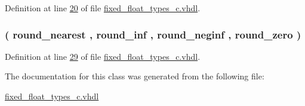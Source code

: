 Definition at line \hyperlink{fixed__float__types__c_8vhdl_source_l00020}{20} of file \hyperlink{fixed__float__types__c_8vhdl_source}{fixed\+\_\+float\+\_\+types\+\_\+c.\+vhdl}.

\hypertarget{classfixed__float__types_a3cab38cfb8c7d6b81f4f0b9953cd212f}{}
\subsubsection[{round\+\_\+type}]{ {\bfseries \textcolor{vhdlchar}{(}\textcolor{vhdlchar}{ }\textcolor{vhdlchar}{round\+\_\+nearest}\textcolor{vhdlchar}{ }\textcolor{vhdlchar}{,}\textcolor{vhdlchar}{ }\textcolor{vhdlchar}{round\+\_\+inf}\textcolor{vhdlchar}{ }\textcolor{vhdlchar}{,}\textcolor{vhdlchar}{ }\textcolor{vhdlchar}{round\+\_\+neginf}\textcolor{vhdlchar}{ }\textcolor{vhdlchar}{,}\textcolor{vhdlchar}{ }\textcolor{vhdlchar}{round\+\_\+zero}\textcolor{vhdlchar}{ }\textcolor{vhdlchar}{)}\textcolor{vhdlchar}{ }} \hspace{0.3cm}{\ttfamily [Type]}}\label{classfixed__float__types_a3cab38cfb8c7d6b81f4f0b9953cd212f}


Definition at line \hyperlink{fixed__float__types__c_8vhdl_source_l00029}{29} of file \hyperlink{fixed__float__types__c_8vhdl_source}{fixed\+\_\+float\+\_\+types\+\_\+c.\+vhdl}.



The documentation for this class was generated from the following file\+:\begin{DoxyCompactItemize}
\item 
\hyperlink{fixed__float__types__c_8vhdl}{fixed\+\_\+float\+\_\+types\+\_\+c.\+vhdl}\end{DoxyCompactItemize}
